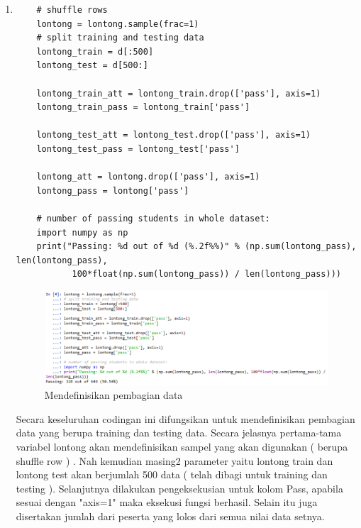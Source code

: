 \begin{enumerate}
\item
\begin{verbatim}
	# shuffle rows
	lontong = lontong.sample(frac=1)
	# split training and testing data
	lontong_train = d[:500]
	lontong_test = d[500:]

	lontong_train_att = lontong_train.drop(['pass'], axis=1)
	lontong_train_pass = lontong_train['pass']

	lontong_test_att = lontong_test.drop(['pass'], axis=1)
	lontong_test_pass = lontong_test['pass']

	lontong_att = lontong.drop(['pass'], axis=1)
	lontong_pass = lontong['pass']

	# number of passing students in whole dataset:
	import numpy as np
	print("Passing: %d out of %d (%.2f%%)" % (np.sum(lontong_pass), len(lontong_pass), 
	       100*float(np.sum(lontong_pass)) / len(lontong_pass)))
\end{verbatim}
\begin{figure}[ht]
\centering
\includegraphics[scale=0.6]{figures/lontong/4.png}
\caption{Mendefinisikan pembagian data}
\end{figure}
\par
	Secara keseluruhan codingan ini difungsikan untuk mendefinisikan pembagian data yang berupa training dan testing data. Secara jelasnya pertama-tama variabel lontong akan mendefinisikan sampel yang akan digunakan ( berupa shuffle row ) . Nah kemudian masing2 parameter yaitu lontong train dan lontong test akan berjumlah 500 data ( telah dibagi untuk training dan testing ). Selanjutnya dilakukan pengeksekusian untuk kolom Pass, apabila sesuai dengan "axis=1" maka eksekusi fungsi berhasil. Selain itu juga disertakan jumlah dari peserta yang lolos dari semua nilai data setnya.


\end{enumerate}

